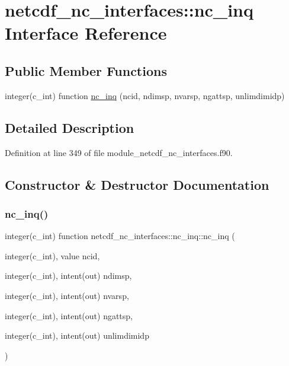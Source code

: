 \hypertarget{interfacenetcdf__nc__interfaces_1_1nc__inq}{}\section{netcdf\+\_\+nc\+\_\+interfaces\+:\+:nc\+\_\+inq Interface Reference}
\label{interfacenetcdf__nc__interfaces_1_1nc__inq}
\subsection*{Public Member Functions}
\begin{DoxyCompactItemize}
\item 
integer(c\+\_\+int) function \hyperlink{interfacenetcdf__nc__interfaces_1_1nc__inq_a0ab5d94fb721bd5632a44bfee0d7d33e}{nc\+\_\+inq} (ncid, ndimsp, nvarsp, ngattsp, unlimdimidp)
\end{DoxyCompactItemize}


\subsection{Detailed Description}


Definition at line 349 of file module\+\_\+netcdf\+\_\+nc\+\_\+interfaces.\+f90.



\subsection{Constructor \& Destructor Documentation}
\mbox{\label{interfacenetcdf__nc__interfaces_1_1nc__inq_a0ab5d94fb721bd5632a44bfee0d7d33e}} 
\subsubsection{\texorpdfstring{nc\+\_\+inq()}{nc\_inq()}}
{\footnotesize\ttfamily integer(c\+\_\+int) function netcdf\+\_\+nc\+\_\+interfaces\+::nc\+\_\+inq\+::nc\+\_\+inq (\begin{DoxyParamCaption}\item[{integer(c\+\_\+int), value}]{ncid,  }\item[{integer(c\+\_\+int), intent(out)}]{ndimsp,  }\item[{integer(c\+\_\+int), intent(out)}]{nvarsp,  }\item[{integer(c\+\_\+int), intent(out)}]{ngattsp,  }\item[{integer(c\+\_\+int), intent(out)}]{unlimdimidp }\end{DoxyParamCaption})}



